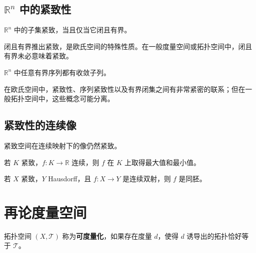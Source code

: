 \subsection{\texorpdfstring{$\mathbb{R}^n$}{Rn} 中的紧致性}

\begin{theorem}
$\mathbb{R}^n$ 中的子集紧致，当且仅当它闭且有界。
\end{theorem}

\begin{remark}
闭且有界推出紧致，是欧氏空间的特殊性质。在一般度量空间或拓扑空间中，闭且有界未必意味着紧致。
\end{remark}

\begin{theorem}
$\mathbb{R}^n$ 中任意有界序列都有收敛子列。
\end{theorem}

\begin{remark}
在欧氏空间中，紧致性、序列紧致性以及有界闭集之间有非常紧密的联系；但在一般拓扑空间中，这些概念可能分离。
\end{remark}

\subsection{紧致性的连续像}

\begin{theorem}
紧致空间在连续映射下的像仍然紧致。
\end{theorem}

\begin{theorem}[极值定理]
若 $K$ 紧致，$f:K\to\mathbb{R}$ 连续，则 $f$ 在 $K$ 上取得最大值和最小值。
\end{theorem}

\begin{theorem}
若 $X$ 紧致，$Y$ Hausdorff，且 $f:X\to Y$ 是连续双射，则 $f$ 是同胚。
\end{theorem}

\section{再论度量空间}

\begin{definition}[可度量化空间]
拓扑空间 $(X,\mathcal{T})$ 称为\textbf{可度量化}，如果存在度量 $d$，使得 $d$ 诱导出的拓扑恰好等于 $\mathcal{T}$。
\end{definition}


